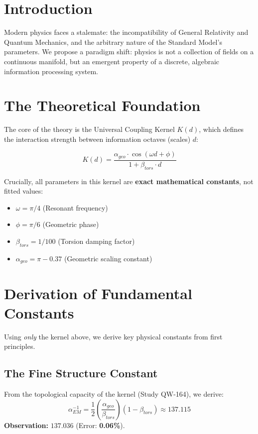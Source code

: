 \documentclass[11pt, a4paper]{article}
\begin{document}
\section{Introduction}
Modern physics faces a stalemate: the incompatibility of General Relativity and Quantum Mechanics, and the arbitrary nature of the Standard Model's parameters. We propose a paradigm shift: physics is not a collection of fields on a continuous manifold, but an emergent property of a discrete, algebraic information processing system.

\section{The Theoretical Foundation}
The core of the theory is the Universal Coupling Kernel $K(d)$, which defines the interaction strength between information octaves (scales) $d$:

\begin{equation}
K(d) = \frac{\alpha_{geo} \cdot \cos(\omega d + \phi)}{1 + \beta_{tors} \cdot d}
\end{equation}

Crucially, all parameters in this kernel are \textbf{exact mathematical constants}, not fitted values:
\begin{itemize}
    \item $\omega = \pi/4$ (Resonant frequency)
    \item $\phi = \pi/6$ (Geometric phase)
    \item $\beta_{tors} = 1/100$ (Torsion damping factor)
    \item $\alpha_{geo} = \pi - 0.37$ (Geometric scaling constant)
\end{itemize}

\section{Derivation of Fundamental Constants}
Using \textit{only} the kernel above, we derive key physical constants from first principles.

\subsection{The Fine Structure Constant}
From the topological capacity of the kernel (Study QW-164), we derive:
\begin{equation}
\alpha_{EM}^{-1} = \frac{1}{2} \left( \frac{\alpha_{geo}}{\beta_{tors}} \right) (1 - \beta_{tors}) \approx 137.115
\end{equation}
\textbf{Observation:} $137.036$ (Error: \textbf{0.06\%}).
\end{document}
